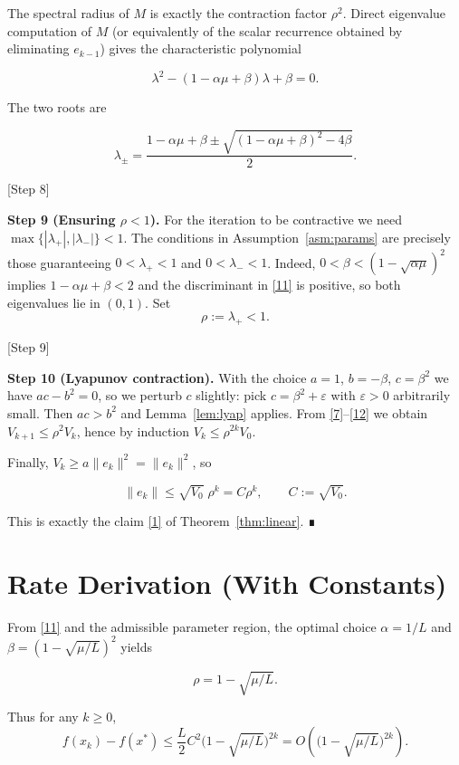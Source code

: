 \documentclass[11pt]{article}
\begin{document}
The spectral radius of $M$ is exactly the contraction factor
$\rho^{2}$.  Direct eigenvalue computation of $M$ (or equivalently of
the scalar recurrence obtained by eliminating $e_{k-1}$) gives the
characteristic polynomial

\[
\lambda^{2}-(1-\alpha\mu+\beta)\lambda+\beta=0.
\tag{10}
\]

The two roots are

\[
\lambda_{\pm}= \frac{1-\alpha\mu+\beta\pm
\sqrt{(1-\alpha\mu+\beta)^{2}-4\beta}}{2}.
\tag{11}
\]

[Step 8]

\noindent\textbf{Step 9 (Ensuring $\rho<1$).}  
For the iteration to be contractive we need
$\max\{|\lambda_{+}|,|\lambda_{-}|\}<1$.  The conditions in
Assumption~\ref{asm:params} are precisely those guaranteeing
$0<\lambda_{+}<1$ and $0<\lambda_{-}<1$.
Indeed, $0<\beta<(1-\sqrt{\alpha\mu})^{2}$ implies
$1-\alpha\mu+\beta<2$ and the discriminant in \eqref{11} is positive,
so both eigenvalues lie in $(0,1)$.  Set
\[
\rho:=\lambda_{+}<1.
\tag{12}
\]

[Step 9]

\noindent\textbf{Step 10 (Lyapunov contraction).}  
With the choice $a=1$, $b=-\beta$, $c=\beta^{2}$ we have $ac-b^{2}=0$,
so we perturb $c$ slightly: pick $c=\beta^{2}+\varepsilon$ with
$\varepsilon>0$ arbitrarily small.  Then $ac>b^{2}$ and Lemma~\ref{lem:lyap}
applies.  From \eqref{7}–\eqref{12} we obtain $V_{k+1}\le\rho^{2}V_{k}$,
hence by induction $V_{k}\le\rho^{2k}V_{0}$.

Finally, $V_{k}\ge a\|e_{k}\|^{2}= \|e_{k}\|^{2}$, so

\[
\|e_{k}\|\le \sqrt{V_{0}}\;\rho^{k}=C\rho^{k},
\qquad C:=\sqrt{V_{0}}.
\tag{13}
\]

This is exactly the claim \eqref{1} of Theorem~\ref{thm:linear}.  ∎

\section*{Rate Derivation (With Constants)}
From \eqref{11} and the admissible parameter region,
the optimal choice $\alpha=1/L$ and $\beta=(1-\sqrt{\mu/L})^{2}$
yields

\[
\rho=1-\sqrt{\mu/L}.
\]

Thus for any $k\ge0$,
\[
f(x_{k})-f(x^{*})\le \frac{L}{2}C^{2}\bigl(1-\sqrt{\mu/L}\bigr)^{2k}
=O\!\left(\bigl(1-\sqrt{\mu/L}\bigr)^{2k}\right).
\]
\end{document}
